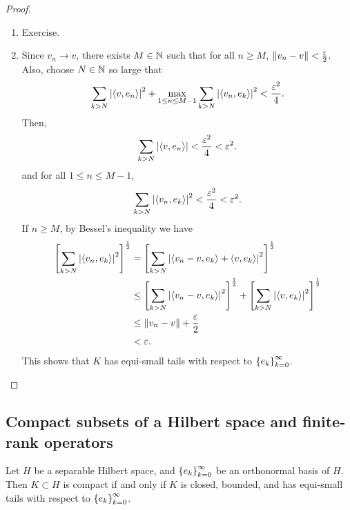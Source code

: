 \documentclass[a4paper]{article}
\begin{document}
\begin{proof}
\begin{enumerate}
  \item Exercise.
  
  \item Since $v_n \to v$, there exists 
  $M \in \mathbb{N}$ such that for all $n \geq M$, 
  $\left\lVert v_n - v\right\rVert < \frac{\varepsilon}{2}$. Also, choose 
  $N \in \mathbb{N}$ so large that 
  \[
  \sum_{k > N} \left\lvert \left\langle v, e_n \right\rangle\right\rvert^2 
  + \max_{1 \leq n \leq M - 1} \sum_{k > N} 
  \left\lvert \left\langle v_n, e_k \right\rangle\right\rvert^2 < \frac{\varepsilon^2}{4}.
  \]
  Then, 
  \[
  \sum_{k > N} \left\lvert \left\langle v, e_n \right\rangle\right\rvert < \frac{\varepsilon^2}{4}
  < \varepsilon^2.
  \]
  and for all $1 \leq n \leq M - 1$, 
  \[
  \sum_{k > N} \left\lvert \left\langle v_n, e_k \right\rangle\right\rvert^2 < \frac{\varepsilon^2}{4} 
  < \varepsilon^2.
  \]
  If $n \geq M$, by Bessel's inequality we have 
  \[
  \begin{aligned}
    \left[ \sum_{k > N} \left\lvert \left\langle v_n, e_k \right\rangle\right\rvert^2 \right]^{\frac{1}{2}}
    & = \left[ \sum_{k > N} \left\lvert \left\langle v_n - v, e_k \right\rangle + \left\langle v, e_k \right\rangle\right\rvert^2 
    \right]^{\frac{1}{2}} \\
    & \leq 
    \left[ \sum_{k > N} \left\lvert \left\langle v_n - v, e_k \right\rangle\right\rvert^2 \right]^{\frac{1}{2}} 
    + \left[ \sum_{k > N} \left\lvert \left\langle v, e_k \right\rangle\right\rvert^2  \right]^{\frac{1}{2}} \\ 
    & \leq \left\lVert v_n - v\right\rVert + \frac{\varepsilon}{2} \\
    &< \varepsilon.
  \end{aligned}
  \]
  This shows that $K$ has equi-small tails with respect 
  to $\left\{ e_k \right\}_{k=0}^\infty$.
\end{enumerate}
\end{proof}

\subsection{Compact subsets of a Hilbert space and 
finite-rank operators} 

\begin{thm}
Let $H$ be a separable Hilbert space, and 
$\left\{ e_k \right\}_{k=0}^\infty$ be an orthonormal basis of $H$. 
Then $K \subset H$ is compact if and only if 
$K$ is closed, bounded, and has equi-small tails 
with respect to $\left\{ e_k \right\}_{k=0}^\infty$.
\end{thm}
\end{document}
